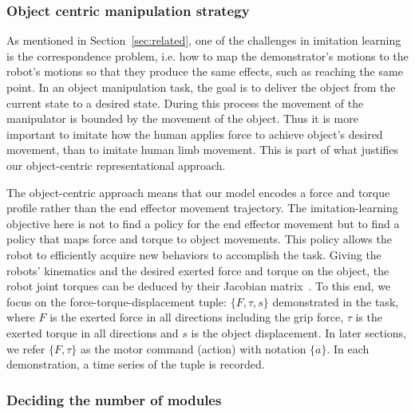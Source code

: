\subsubsection{Object centric manipulation strategy}
\label{sec:objectlevel}
As mentioned in Section~\ref{sec:related}, one of the challenges in
imitation learning is the correspondence problem, i.e. how to map the
demonstrator's motions to the robot's motions so that they produce the
same effects, such as reaching the same
point. %
In an object manipulation task, the goal is to deliver the object from
the current state to a desired state. During this process the movement
of the manipulator is bounded by the movement of the object. Thus it is
more important to imitate how the human applies force to achieve object's
desired movement, than to imitate human limb movement.  This is part
of what justifies our object-centric representational approach.

The object-centric approach means that our model encodes a force and
torque profile rather than the end effector movement trajectory.  The
imitation-learning objective here is not to find a policy for the end
effector movement but to find a policy that maps  force and torque
to object movements. This policy allows the robot to efficiently
acquire new behaviors to accomplish the
task. %
Giving the robots' kinematics and the desired exerted force and torque
on the object, the robot joint torques can be deduced by their Jacobian
matrix~\citep{okamura2000overview}. To this end, we focus on the
force-torque-displacement tuple: $\{F,\tau,s\}$ demonstrated in the
task, where $F$ is the exerted force in all directions including the
grip force, $\tau$ is the exerted torque in all directions and $s$ is
the object displacement. In later sections, we refer $\{F,\tau\}$ as
the motor command (action) with notation $\{a\}$. In each
demonstration, a time series of the tuple is recorded.



\subsubsection{Deciding the number of modules}
\label{sec:cluster}

